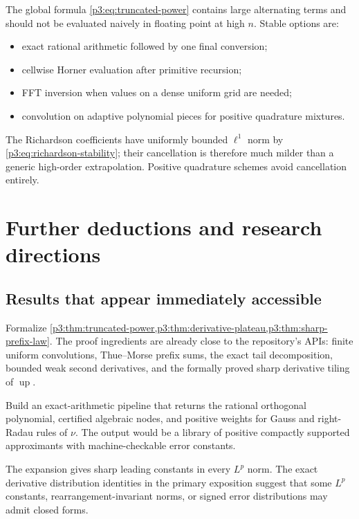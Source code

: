 \documentclass[11pt,oneside]{article}
\numberwithin{equation}{section}
\theoremstyle{definition}
\theoremstyle{remark}
\newcommand{\Up}{\operatorname{up}}
\begin{document}
The global formula \cref{p3:eq:truncated-power} contains large alternating terms and should
not be evaluated naively in floating point at high $n$.  Stable options are:
\begin{itemize}[leftmargin=2em]
\item exact rational arithmetic followed by one final conversion;
\item cellwise Horner evaluation after primitive recursion;
\item FFT inversion when values on a dense uniform grid are needed;
\item convolution on adaptive polynomial pieces for positive quadrature mixtures.
\end{itemize}
The Richardson coefficients have uniformly bounded $\ell^1$ norm by
\cref{p3:eq:richardson-stability}; their cancellation is therefore much milder than a
generic high-order extrapolation.  Positive quadrature schemes avoid cancellation
entirely.

\section{Further deductions and research directions}
\label{p3:sec:future}

\subsection{Results that appear immediately accessible}

\begin{problem}
Formalize \cref{p3:thm:truncated-power,p3:thm:derivative-plateau,p3:thm:sharp-prefix-law}.
The proof ingredients are already close to the repository's APIs: finite uniform
convolutions, Thue--Morse prefix sums, the exact tail decomposition, bounded weak
second derivatives, and the formally proved sharp derivative tiling of $\Up$.
\end{problem}

\begin{problem}
Build an exact-arithmetic pipeline that returns the rational orthogonal polynomial,
certified algebraic nodes, and positive weights for Gauss and right-Radau rules of
$\nu$.  The output would be a library of positive compactly supported approximants with
machine-checkable error constants.
\end{problem}

\begin{problem}
The expansion gives sharp leading constants in every $L^p$ norm.  The exact derivative
distribution identities in the primary exposition suggest that some $L^p$ constants,
rearrangement-invariant norms, or signed error distributions may admit closed forms.
\end{problem}
\end{document}
